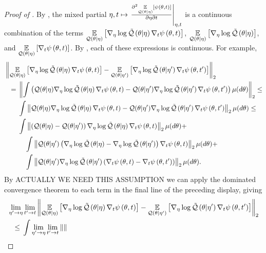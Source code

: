 %
\begin{proof}[Proof of ]
%
By , the mixed partial $ \eta, t \mapsto \left.\frac{\partial^2
\underset{\mathcal{Q}(\theta \vert \eta)}{\mathbb{E}}\left[\psi(\theta, t)\right]}{\partial \eta \partial
t}\right\vert_{\eta, t}$ is a continuous combination of the terms
%
$\underset{\mathcal{Q}(\theta \vert \eta)}{\mathbb{E}}\left[{\nabla_\eta \log \tilde{\mathcal{Q}}}\left(\theta \vert \eta\right) {\nabla_t \psi}\left(\theta,t\right)\right]$,
%
$\underset{\mathcal{Q}(\theta \vert \eta)}{\mathbb{E}}\left[{\nabla_\eta \log \tilde{\mathcal{Q}}}\left(\theta \vert \eta\right)\right]$, and
%
$\underset{\mathcal{Q}(\theta \vert \eta)}{\mathbb{E}}\left[{\nabla_t \psi}\left(\theta,t\right)\right]$.
%
By , each of these expressions is continuous.  For
example,
%
\begin{align*}
%
\MoveEqLeft
\norm{\expect{\q(\theta \vert \eta)}
       {\lqgrad{\theta \vert \eta} \psigrad{\theta,\t}} -
   \expect{\q(\theta \vert \eta')}
          {\lqgrad{\theta \vert \eta'} \psigrad{\theta,\t'}}
      }_2 \\={}&
%
\norm{\int \left(
\q(\theta \vert \eta) \lqgrad{\theta \vert \eta} \psigrad{\theta,\t} -
\q(\theta \vert \eta') \lqgrad{\theta \vert \eta'} \psigrad{\theta,\t'}
\right)\mu(d\theta)
}_2  \le\\&
%
\int \norm{
\q(\theta \vert \eta) \lqgrad{\theta \vert \eta} \psigrad{\theta,\t} -
\q(\theta \vert \eta') \lqgrad{\theta \vert \eta'} \psigrad{\theta,\t'}
}_2 \mu(d\theta) \le\\&
%
\int \norm{
\left(\q(\theta \vert \eta) - \q(\theta \vert \eta')\right)
    \lqgrad{\theta \vert \eta} \psigrad{\theta, \t}
}_2 \mu(d\theta) + \\&\quad
%
\int \norm{
\q(\theta \vert \eta')
    \left( \lqgrad{\theta \vert \eta} - \lqgrad{\theta \vert \eta'} \right)
    \psigrad{\theta, \t}
}_2 \mu(d\theta) + \\&\quad
%
\int \norm{
\q(\theta \vert \eta')\lqgrad{\theta \vert \eta'}
    \left( \psigrad{\theta, \t} - \psigrad{\theta, \t'} \right)
}_2 \mu(d\theta).
%
\end{align*}
%
By ACTUALLY WE NEED THIS ASSUMPTION we can apply the dominated
convergence theorem to
each term in the final line of the preceding display, giving
%
\begin{align*}
%
\MoveEqLeft
\lim_{\eta' \rightarrow \eta} \lim_{\t' \rightarrow \t}
\norm{\expect{\q(\theta \vert \eta)}
       {\lqgrad{\theta \vert \eta} \psigrad{\theta,\t}} -
   \expect{\q(\theta \vert \eta')}
          {\lqgrad{\theta \vert \eta'} \psigrad{\theta,\t'}}
      }_2 \\\le{}&
%
\int \lim_{\eta' \rightarrow \eta} \lim_{\t' \rightarrow \t} \norm{
}
\end{align*}
\end{proof}
